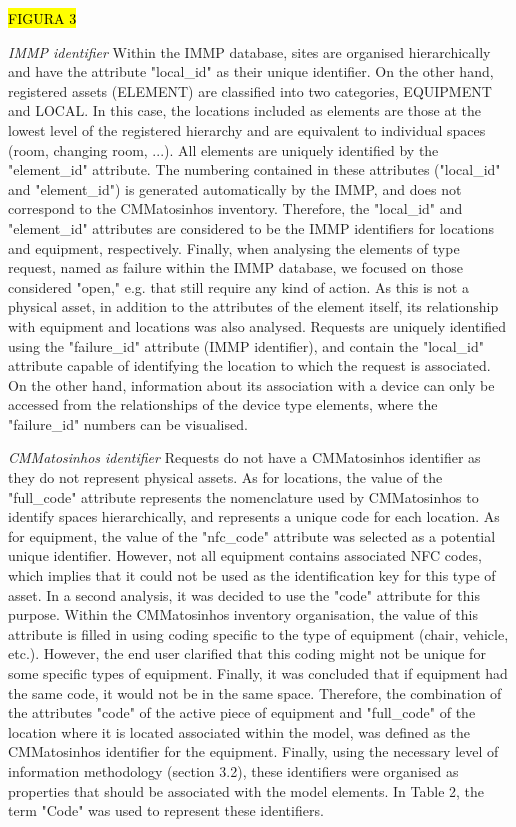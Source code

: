 \hl{FIGURA 3}

\emph{IMMP identifier}
Within the IMMP database, sites are organised hierarchically and have the attribute "local\_id" as their unique identifier. On the other hand, registered assets (ELEMENT) are classified into two categories, EQUIPMENT and LOCAL. In this case, the locations included as elements are those at the lowest level of the registered hierarchy and are equivalent to individual spaces (room, changing room, ...). All elements are uniquely identified by the "element\_id" attribute. The numbering contained in these attributes ("local\_id" and "element\_id") is generated automatically by the IMMP, and does not correspond to the CMMatosinhos inventory. Therefore, the "local\_id" and "element\_id" attributes are considered to be the IMMP identifiers for locations and equipment, respectively. Finally, when analysing the elements of type request, named as failure within the IMMP database, we focused on those considered "open," e.g. that still require any kind of action. As this is not a physical asset, in addition to the attributes of the element itself, its relationship with equipment and locations was also analysed. Requests are uniquely identified using the "failure\_id" attribute (IMMP identifier), and contain the "local\_id" attribute capable of identifying the location to which the request is associated. On the other hand, information about its association with a device can only be accessed from the relationships of the device type elements, where the "failure\_id" numbers can be visualised.

\emph{CMMatosinhos identifier}
Requests do not have a CMMatosinhos identifier as they do not represent physical assets. As for locations, the value of the "full\_code" attribute represents the nomenclature used by CMMatosinhos to identify spaces hierarchically, and represents a unique code for each location. As for equipment, the value of the "nfc\_code" attribute was selected as a potential unique identifier. However, not all equipment contains associated NFC codes, which implies that it could not be used as the identification key for this type of asset. In a second analysis, it was decided to use the "code" attribute for this purpose. Within the CMMatosinhos inventory organisation, the value of this attribute is filled in using coding specific to the type of equipment (chair, vehicle, etc.). However, the end user clarified that this coding might not be unique for some specific types of equipment. Finally, it was concluded that if equipment had the same code, it would not be in the same space. Therefore, the combination of the attributes "code" of the active piece of equipment and "full\_code" of the location where it is located associated within the model, was defined as the CMMatosinhos identifier for the equipment. Finally, using the necessary level of information methodology (section 3.2), these identifiers were organised as properties that should be associated with the model elements. In Table 2, the term "Code" was used to represent these identifiers.

